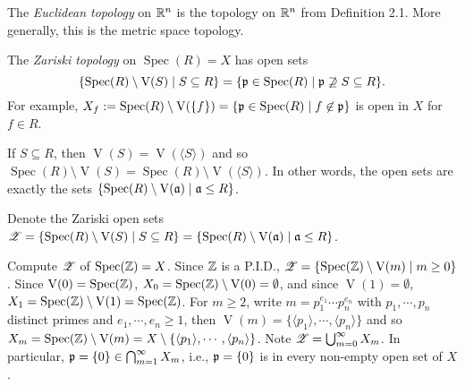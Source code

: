 \begin{example}
    The \emph{Euclidean topology} on $\mathbb{R}^n$ is the topology on $\mathbb{R}^n$ from Definition 2.1. More generally, this is the metric space topology.
\end{example}

\begin{definition}
    The \emph{Zariski topology} on $\operatorname{Spec}(R) = X$ has open sets 
    \[\{\operatorname{Spec}(R) \setminus \operatorname{V}(S) \mid S \subseteq R\} = \{\mathfrak{p} \in \operatorname{Spec}(R) \mid \mathfrak{p} \not \supseteq S \subseteq R\}.\] 
    For example, $X_f := \operatorname{Spec}(R) \setminus \operatorname{V}(\{f\}) = \{\mathfrak{p} \in \operatorname{Spec}(R) \mid f \not \in \mathfrak{p}\}$ is open in $X$ for $f \in R$.
\end{definition}

\begin{proposition}
    If $S \subseteq R$, then $\operatorname{V}(S) = \operatorname{V}(\langle S \rangle)$ and so $\operatorname{Spec}(R) \setminus \operatorname{V}(S) = \operatorname{Spec}(R) \setminus \operatorname{V}(\langle S \rangle)$. In other words, the open sets are exactly the sets $\{\operatorname{Spec}(R) \setminus \operatorname{V}(\mathfrak{a}) \mid \mathfrak{a} \leq R\}$. 
\end{proposition}

\begin{notation*}
    Denote the Zariski open sets $\mathscr{Z} = \{\operatorname{Spec}(R) \setminus \operatorname{V}(S) \mid S \subseteq R\} = \{\operatorname{Spec}(R) \setminus \operatorname{V}(\mathfrak{a}) \mid \mathfrak{a} \leq R\}$.
\end{notation*}

\begin{example}
    Compute $\mathscr{Z}$ of $\operatorname{Spec}(\mathbb{Z}) = X$. Since $\mathbb{Z}$ is a P.I.D., $\mathscr{Z} = \{\operatorname{Spec}(\mathbb{Z}) \setminus \operatorname{V}(m) \mid m \geq 0\}$. Since $\operatorname{V}(0) = \operatorname{Spec}(\mathbb{Z})$, $X_0 = \operatorname{Spec}(\mathbb{Z}) \setminus \operatorname{V}(0) = \emptyset$, and since $\operatorname{V}(1) = \emptyset$, $X_1 = \operatorname{Spec}(\mathbb{Z}) \setminus \operatorname{V}(1) = \operatorname{Spec}(\mathbb{Z})$. For $m \geq 2$, write $m = p_1^{e_1} \cdots p_n^{e_n}$ with $p_1,\cdots,p_n$ distinct primes and $e_1,\cdots,e_n \geq 1$, then $\operatorname{V}(m) = \{\langle p_1 \rangle, \cdots, \langle p_n \rangle\}$ and so $X_m = \operatorname{Spec}(\mathbb{Z}) \setminus \operatorname{V}(m) = X \setminus \{\langle p_1 \rangle,\cdots, \langle p_n \rangle\}$. Note $\mathscr{Z} = \bigcup_{m=0}^\infty X_m$. In particular, $\mathfrak{p} = \{0\} \in \bigcap_{m=1}^\infty X_m$, i.e., $\mathfrak{p} = \{0\}$ is in every non-empty open set of $X$.
\end{example}

